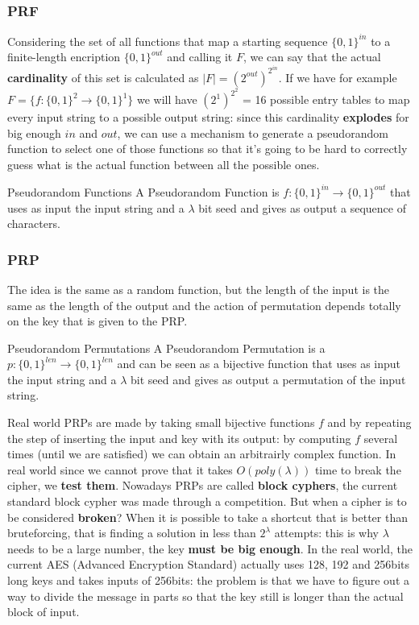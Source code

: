 \subsubsection{PRF}
Considering the set of all functions that map a starting sequence 
$\{0,1\}^{in}$ to a finite-length encription $\{0,1\}^{out}$ and calling
it $F$, we can say that the actual \textbf{cardinality} of this set is 
calculated as $|F| = (2^{out})^{2^{in}}$. \newline
If we have for example $F = \{f:\{0,1\}^2\rightarrow\{0,1\}^1\}$ we will have
$(2^1)^{2^2}$ = 16 possible entry tables to map every input string to a 
possible output string: since this cardinality \textbf{explodes} for big 
enough $in$ and $out$, we can use a mechanism to generate a pseudorandom 
function to select one of those functions so that it's going to be hard to
correctly guess what is the actual function between all the possible ones. 
\begin{key}{Pseudorandom Functions}
    A Pseudorandom Function is $f:\{0,1\}^{in}\rightarrow\{0,1\}^{out}$
    that uses as input the input string and a $\lambda$ bit seed and gives
    as output a sequence of characters.
\end{key}

\subsubsection{PRP}
The idea is the same as a random function, but the length of the input is 
the same as the length of the output and the action of permutation depends
totally on the key that is given to the PRP. 
\begin{key}{Pseudorandom Permutations}
    A Pseudorandom Permutation is a $p: \{0,1\}^{len}\rightarrow \{0,1\}^{len}$
    and can be seen as a bijective function that uses as input the input 
    string and a $\lambda$ bit seed and gives as
    output a permutation of the input string.
\end{key}
Real world PRPs are made by taking small bijective functions $f$ and by 
repeating the step of inserting the input and key with its output: 
by computing $f$ several times (until we are satisfied) we can obtain an 
arbitrairly complex function. In real world since we cannot prove that it takes 
$O(poly(\lambda))$ time to break the cipher, we \textbf{test them}. Nowadays 
PRPs are called \textbf{block cyphers}, the current standard block cypher was 
made through a competition. But when a cipher is to be considered \textbf{broken}? 
When it is possible to take a shortcut that is better than bruteforcing, that
is finding a solution in less than $2^{\lambda}$ attempts: this is why $\lambda$
needs to be a large number, the key \textbf{must be big enough}. 
In the real world, the current AES (Advanced Encryption Standard) 
actually uses 128, 192 and 256bits long keys and takes inputs of 256bits: 
the problem is that we have to figure out a way to divide the message in 
parts so that the key still is longer than the actual block of input. 


